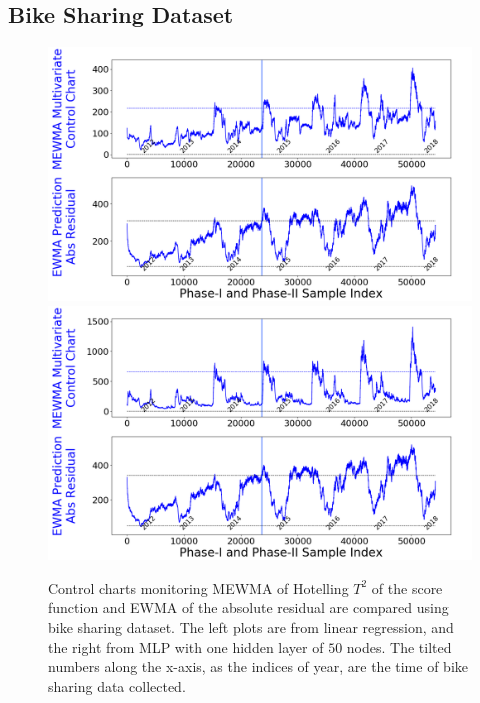 \documentclass[twoside,11pt]{article}
\begin{document}
\subsection{Bike Sharing Dataset}
\label{ss:bs_ds}
\begin{figure}[!htbp]
\centering
\includegraphics[width = 0.49\linewidth, trim=0in 2.6in 0in 0in, clip]{../figures/v14/bike_sharing/reg_scal_train/bike_reg_1e-08_0_0001_0_005_99_0.png}
\includegraphics[width = 0.49\linewidth, trim=0in 2.6in 0in 0in, clip]{../figures/v14/bike_sharing/reg_nnet_scal_train/bike_reg_0_1_0_0001_0_005_99_0.png}
  \caption{
Control charts monitoring MEWMA of Hotelling $T^2$ of the score function and EWMA of the absolute residual are compared using bike sharing dataset. The left plots are from linear regression, and the right from MLP with one hidden layer of $50$ nodes. The tilted numbers along the x-axis, as the indices of year, are the time of bike sharing data collected.
}
\label{fig:bike_sharing}
\end{figure}
\end{document}
